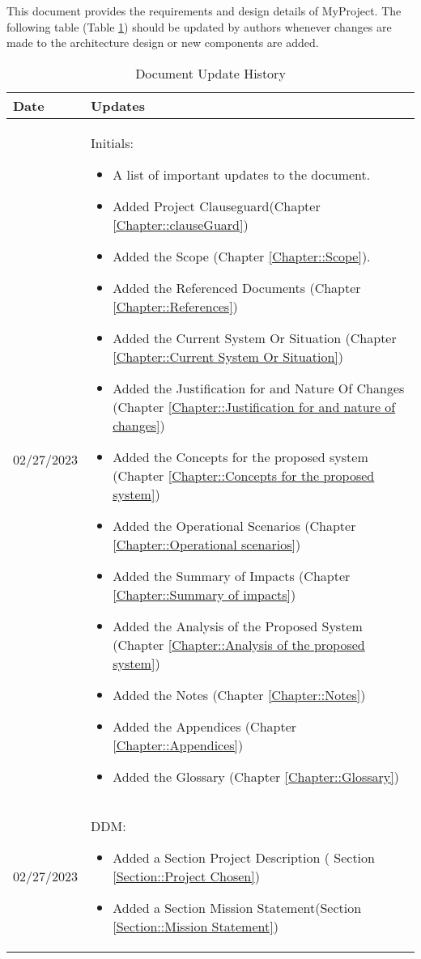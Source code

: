 This document provides the requirements and design details of MyProject.  
The following table (Table \ref{Table::UpdateHistory}) should be
updated by authors whenever changes are made to the architecture
design or new components are added.  

\begin{longtable}{|l||p{13.5cm}|}
\caption{Document Update History \label{Table::UpdateHistory}}\\
\hline
\textbf{Date} & \textbf{Updates} \\
\hline 
\endhead

02/27/2023 & Initials:
\begin{itemize}[topsep=0pt,itemsep=0pt,parsep=0pt,partopsep=0pt,leftmargin=12pt]
\item A list of important updates to the document.
\item Added Project Clauseguard(Chapter \ref{Chapter::clauseGuard})
\item Added the Scope (Chapter \ref{Chapter::Scope}). 
\item Added the Referenced Documents (Chapter \ref{Chapter::References})
\item Added the Current System Or Situation (Chapter \ref{Chapter::Current System Or Situation})
\item Added the Justification for and Nature Of Changes (Chapter \ref{Chapter::Justification for and nature of changes})
\item Added the Concepts for the proposed system (Chapter \ref{Chapter::Concepts for the proposed system})
\item Added the Operational Scenarios (Chapter \ref{Chapter::Operational scenarios})
\item Added the Summary of Impacts (Chapter \ref{Chapter::Summary of impacts})
\item Added the Analysis of the Proposed System (Chapter \ref{Chapter::Analysis of the proposed system})
\item Added the Notes (Chapter \ref{Chapter::Notes})
\item Added the Appendices (Chapter \ref{Chapter::Appendices})
\item Added the Glossary (Chapter \ref{Chapter::Glossary})
\end{itemize} 
\\ \hline

02/27/2023 & DDM:
\begin{itemize}[topsep=0pt,itemsep=0pt,parsep=0pt,partopsep=0pt,leftmargin=12pt]
\item Added a Section Project Description ( Section \ref{Section::Project Chosen})
\item Added a Section Mission Statement(Section \ref{Section::Mission Statement})


\end{itemize}
\end{longtable}
